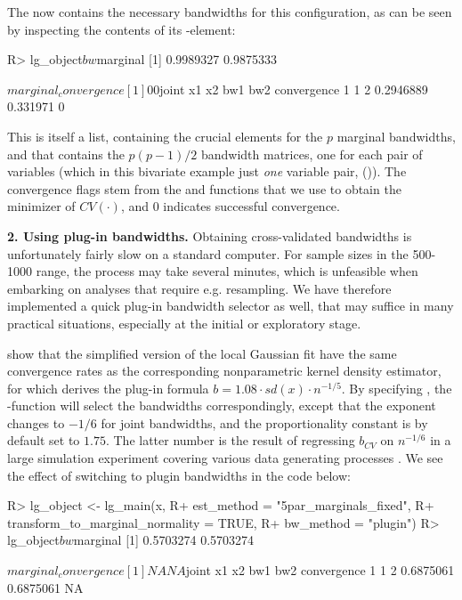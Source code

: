 The  now contains the necessary bandwidths for this configuration, as can be seen by inspecting the contents of its
-element:

\begin{example}
R> lg_object$bw

$marginal
[1] 0.9989327 0.9875333

$marginal_convergence
[1] 0 0

$joint
  x1 x2       bw1      bw2 convergence
1  1  2 0.2946889 0.331971           0
\end{example}
This is itself a list, containing the crucial elements  for the \(p\) marginal bandwidths, and  that contains the
\(p(p-1)/2\) bandwidth matrices, one for each pair of variables (which in this bivariate example just \emph{one} variable pair, ()). The convergence flags stem from the  and  functions that we use to obtain the minimizer of \(CV(\cdot)\), and 0 indicates successful convergence.

\textbf{2. Using plug-in bandwidths.} Obtaining cross-validated bandwidths is unfortunately fairly slow on a standard computer. For sample sizes in the 500-1000 range, the process may take several minutes, which is unfeasible when embarking on analyses that require e.g. resampling. We have therefore implemented a quick plug-in bandwidth selector as well, that may suffice in many practical situations, especially at the initial or exploratory stage. 

\citet{otne:tjos:2017} show that the simplified version of the local Gaussian fit have the same convergence rates as the corresponding nonparametric kernel density estimator, for which \citet{silv:1986} derives the plug-in formula \(b = 1.08\cdot sd(x) \cdot n^{-1/5}\). By
specifying , the -function will select the bandwidths correspondingly, except that the exponent changes to \(-1/6\) for joint bandwidths, and the proportionality constant is by default set to \(1.75\). The latter number is the result of regressing \(b_{CV}\) on \(n^{-1/6}\) in a large simulation experiment covering various data generating processes \citep{otneim2016multivariate}. We see
the effect of switching to plugin bandwidths in the code below: 

\begin{example}
R> lg_object <- lg_main(x,
R+                      est_method = "5par_marginals_fixed",
R+                      transform_to_marginal_normality = TRUE,
R+                      bw_method = "plugin")
R> lg_object$bw

$marginal
[1] 0.5703274 0.5703274

$marginal_convergence
[1] NA NA

$joint
  x1 x2       bw1       bw2 convergence
1  1  2 0.6875061 0.6875061          NA
\end{example}

